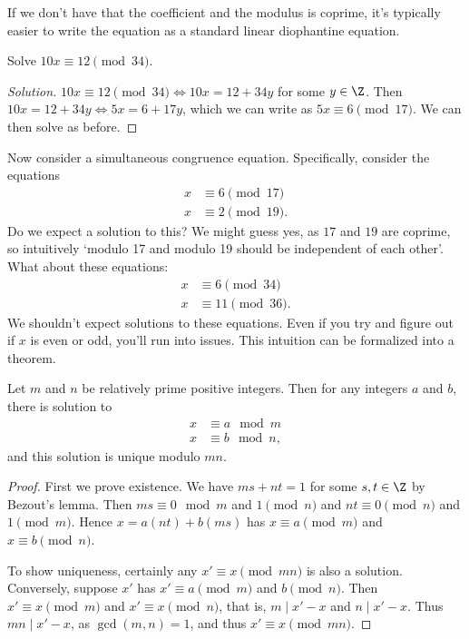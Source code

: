 If we don't have that the coefficient and the modulus is coprime, it's typically easier to write the equation as a standard linear diophantine equation.

\begin{example}
	Solve $10x \equiv 12 \pmod{34}$.
\end{example}
\begin{proof}[Solution]
	$10x \equiv 12 \pmod{34} \iff 10x = 12 + 34 y$ for some $y \in \Z$. Then $10x = 12 + 34y \iff 5x = 6 + 17 y$, which we can write as $5x \equiv 6 \pmod{17}$. We can then solve as before. 
\end{proof}

Now consider a simultaneous congruence equation. Specifically, consider the equations
\begin{align*}
	x &\equiv 6 \pmod{17} \\
	x &\equiv 2 \pmod{19}.
\end{align*}
Do we expect a solution to this? We might guess yes, as $17$ and $19$ are coprime, so intuitively `modulo 17 and modulo 19 should be independent of each other'. What about these equations:
\begin{align*}
	x &\equiv 6 \pmod{34} \\
	x &\equiv 11 \pmod{36}.
\end{align*}
We shouldn't expect solutions to these equations. Even if you try and figure out if $x$ is even or odd, you'll run into issues. This intuition can be formalized into a theorem.

\begin{theorem}
	Let $m$ and $n$ be relatively prime positive integers. Then for any integers $a$ and $b$, there is solution to
	\begin{align*}
		x &\equiv a \mod{m} \\
		x &\equiv b \mod{n},
	\end{align*}
	and this solution is unique modulo $mn$. 
\end{theorem}
\begin{proof}
	First we prove existence. We have $ms + nt = 1$ for some $s, t \in \Z$ by Bezout's lemma. Then $ms \equiv 0 \mod{m}$ and $1 \pmod{n}$ and $nt \equiv 0 \pmod{n}$ and $1 \pmod{m}$. Hence
	$x = a(nt) + b(ms)$ has $x \equiv a \pmod{m}$ and $x \equiv b \pmod{n}$.

	To show uniqueness, certainly any $x' \equiv x \pmod{mn}$ is also a solution. Conversely, suppose $x'$ has $x' \equiv a \pmod{m}$ and $b \pmod{n}$. Then $x' \equiv x \pmod{m}$ and $x' \equiv x \pmod{n}$, that is, $m \mid x' - x$ and $n \mid x' - x$. Thus $mn \mid x' - x$, as $\gcd(m, n) = 1$, and thus $x' \equiv x \pmod{mn}$.
\end{proof}

